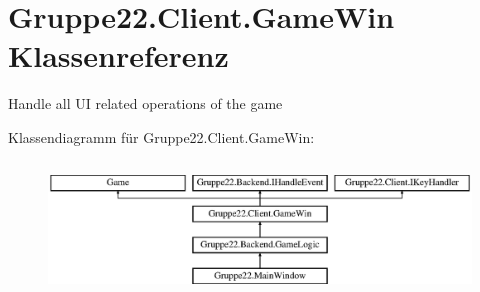 \hypertarget{class_gruppe22_1_1_client_1_1_game_win}{\section{Gruppe22.\-Client.\-Game\-Win Klassenreferenz}
\label{class_gruppe22_1_1_client_1_1_game_win}
}


Handle all U\-I related operations of the game  


Klassendiagramm für Gruppe22.\-Client.\-Game\-Win\-:\begin{figure}[H]
\begin{center}
\leavevmode
\includegraphics[height=3.589744cm]{class_gruppe22_1_1_client_1_1_game_win}
\end{center}
\end{figure}
